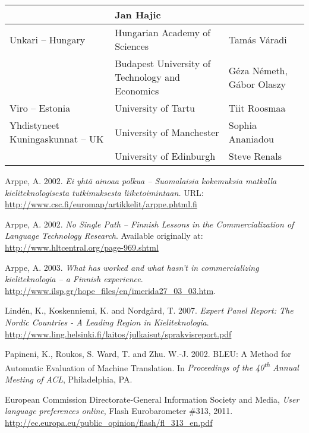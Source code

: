 \documentclass[]{../../metanetpaper}
\begin{document}
\begin{Parallel}[c]{70mm}{70mm}
\begin{longtable}{p{3.5cm}|p{5.5cm}|p{5cm}}
 &  Jan Hajic
 \\ \hline
 Unkari -- Hungary
 &  Hungarian Academy of Sciences
 &  Tamás Váradi
 \\
 &  \raggedright Budapest University of            
    Technology and Economics
 &  Géza Németh,
    Gábor Olaszy
 \\ \hline
 Viro -- Estonia
 &  University of Tartu
 &  Tiit Roosmaa \\ \hline
 Yhdistyneet
 Kuningaskunnat -- UK
 &  University of Manchester
 &  Sophia Ananiadou \\
 &  University of Edinburgh
 &  Steve Renals
 \\ \hline
\end{longtable}



%
%  
%  
\begin{thebibliography}{102}\raggedright
{}
Arppe, A. 2002.
\emph{Ei yhtä ainoaa polkua -- Suomalaisia kokemuksia matkalla
      kieliteknologisesta tutkimuksesta liiketoimintaan.}
URL:
\url{http://www.csc.fi/euromap/artikkelit/arppe.phtml.fi}

Arppe, A. 2002.
\emph{No Single Path -- Finnish Lessons in the Commercialization of
      Language Technology Research}.
Available originally at:
\url{http://www.hltcentral.org/page-969.shtml}

Arppe, A. 2003.
\emph{What has worked and what hasn't in commercializing kieliteknologia --
      a Finnish experience}.
\url{http://www.ilsp.gr/hope_files/en/imerida27_03_03.htm}.

Lindén, K., Koskenniemi, K. and Nordgård, T. 2007.
\emph{Expert Panel Report: The
Nordic Countries - A Leading Region in Kieliteknologia}.
\url{http://www.ling.helsinki.fi/laitos/julkaisut/sprakvisreport.pdf}

Papineni, K., Roukos, S. Ward, T. and Zhu. W.-J. 2002.
BLEU: A Method for Automatic Evaluation of Machine Translation.
In \emph{Proceedings of the 40\textsuperscript{th} Annual Meeting of ACL},
Philadelphia, PA.

European Commission Directorate-General Information Society and Media,
\emph{User language preferences online}, Flash Eurobarometer \#313, 2011.
\url{http://ec.europa.eu/public_opinion/flash/fl_313_en.pdf}


\end{thebibliography}
\end{Parallel}
\end{document}
